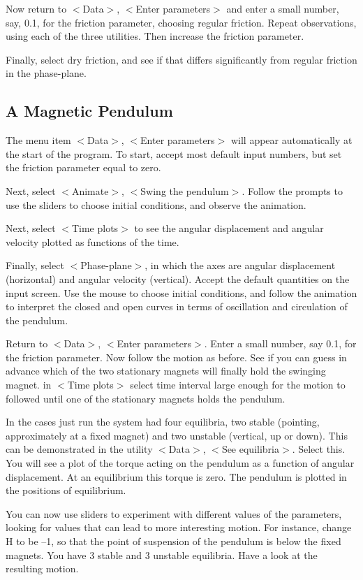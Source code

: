    Now return to $<$Data$>$, $<$Enter parameters$>$ and enter a small number,
say, 0.1, for the friction parameter, choosing regular friction. Repeat
observations, using each of the three utilities. Then increase the
friction parameter.

   Finally, select dry friction, and see if that differs significantly
from regular friction in the phase-plane.



\subsection{A Magnetic Pendulum}

   The menu item $<$Data$>$, $<$Enter parameters$>$ will appear automatically
at the start of the program. To start, accept most default input numbers,
but set the friction parameter equal to zero.

   Next, select $<$Animate$>$, $<$Swing the pendulum$>$. Follow the prompts to
use the sliders to choose initial conditions, and observe the animation.

   Next, select $<$Time plots$>$ to see the angular displacement and angular
velocity plotted as functions of the time.

   Finally, select $<$Phase-plane$>$, in which the axes are angular displacement
(horizontal) and angular velocity (vertical). Accept the default quantities
on the input screen. Use the mouse to choose initial conditions, and
follow the animation to interpret the closed and open curves in terms of
oscillation and circulation of the pendulum.

   Return to $<$Data$>$, $<$Enter parameters$>$. Enter a small number, say 0.1,
for the friction parameter. Now follow the motion as before. See if you
can guess in advance which of the two stationary magnets will finally
hold the swinging magnet. in $<$Time plots$>$ select  time interval large
enough for the motion to followed until one of the stationary magnets
holds the pendulum.

   In the cases just run the system had four equilibria, two stable
(pointing, approximately at a fixed magnet) and two unstable (vertical,
up or down). This can be demonstrated in the utility $<$Data$>$, $<$See
equilibria$>$. Select this. You will see a plot of the torque acting on the
pendulum as a function of angular displacement. At an equilibrium this
torque is zero. The pendulum is plotted in the positions of equilibrium.

   You can now use sliders to experiment with different values of the
parameters, looking for values that can lead to more interesting motion.
For instance, change H to be --1, so that the point of suspension of the
pendulum is below the fixed magnets. You have 3 stable and 3 unstable
equilibria. Have a look at the resulting motion.

